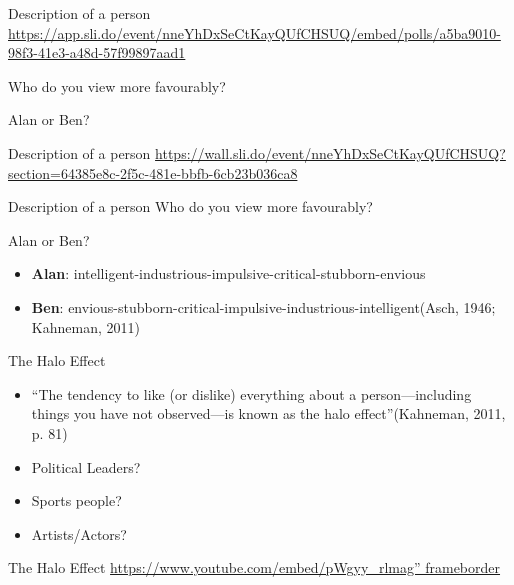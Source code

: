 \documentclass[
  ignorenonframetext,
]{beamer}
\providecommand{\tightlist}{%
  \setlength{\itemsep}{0pt}\setlength{\parskip}{0pt}}\usepackage{longtable,booktabs,array}
\begin{document}
\begin{frame}{Description of a person}
\protect\hypertarget{description-of-a-person}{}
\url{https://app.sli.do/event/nneYhDxSeCtKayQUfCHSUQ/embed/polls/a5ba9010-98f3-41e3-a48d-57f99897aad1}

Who do you view more favourably?

Alan or Ben?
\end{frame}

\begin{frame}{Description of a person}
\protect\hypertarget{description-of-a-person-1}{}
\url{https://wall.sli.do/event/nneYhDxSeCtKayQUfCHSUQ?section=64385e8c-2f5c-481e-bbfb-6cb23b036ca8}
\end{frame}

\begin{frame}{Description of a person}
\protect\hypertarget{description-of-a-person-2}{}
Who do you view more favourably?

Alan or Ben?

\begin{itemize}
\tightlist
\item
  \textbf{Alan}:
  intelligent-industrious-impulsive-critical-stubborn-envious
\end{itemize}

\begin{itemize}
\tightlist
\item
  \textbf{Ben}:
  envious-stubborn-critical-impulsive-industrious-intelligent(Asch,
  1946; Kahneman, 2011)
\end{itemize}
\end{frame}

\begin{frame}{The Halo Effect}
\protect\hypertarget{the-halo-effect}{}
\begin{itemize}
\tightlist
\item
  ``The tendency to like (or dislike) everything about a
  person---including things you have not observed---is known as the halo
  effect''(Kahneman, 2011, p. 81)
\end{itemize}

\begin{itemize}
\tightlist
\item
  Political Leaders?
\item
  Sports people?
\item
  Artists/Actors?
\end{itemize}
\end{frame}

\begin{frame}{The Halo Effect}
\protect\hypertarget{the-halo-effect-1}{}
\href{https://www.youtube.com/embed/pWgyy_rlmag\%22\%20frameborder}{https://www.youtube.com/embed/pWgyy\_rlmag''
frameborder}
\end{frame}
\end{document}
